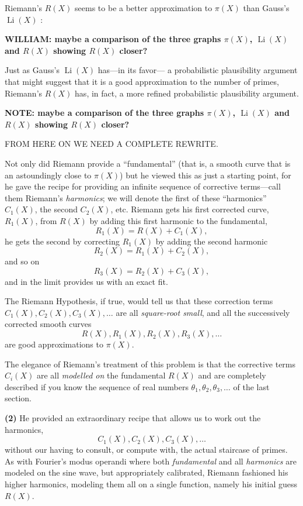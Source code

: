 \documentclass[11pt]{article}
\DeclareMathOperator{\Li}{Li}
\theoremstyle{plain}
\theoremstyle{definition}
\numberwithin{equation}{section}
\numberwithin{figure}{section}
\numberwithin{table}{section}
\begin{document}
{  Riemann's $R(X)$ seems to be a better approximation to $\pi(X)$ than Gauss's $\Li(X)$ :
  
   
\bigskip

{\bf WILLIAM: maybe a comparison of the three graphs $\pi(X)$, $\Li(X)$ and $R(X)$ showing $R(X)$ closer?}


   
\bigskip

Just as Gauss's $\Li(X)$ has---in its favor--- a probabilistic
plausibility argument that might suggest that it is a good
approximation to the number of primes, Riemann's $R(X)$ has, in fact,
a more refined probabilistic plausibility argument.


   
\bigskip

{\bf NOTE: maybe a comparison of the three graphs $\pi(X)$, $\Li(X)$ and $R(X)$ showing $R(X)$ closer?}


   
\bigskip
  
\centerline{FROM HERE ON WE NEED A COMPLETE REWRITE.}

\bigskip


Not only did Riemann provide a ``fundamental'' (that is, a smooth curve
that is an astoundingly close to $\pi(X)$) but he viewed this as just a
starting point, for he gave the recipe for providing an infinite
sequence of corrective terms---call them Riemann's {\em harmonics}; we
will denote the first of these ``harmonics'' $C_1(X)$, the second
$C_2(X)$, etc.  Riemann gets his first corrected curve, $R_1(X)$, from
$R(X)$ by adding this first harmonic to the fundamental, $$R_1(X) =
R(X) + C_1(X),$$ he gets the second by correcting $R_1(X)$ by adding
the second harmonic $$R_2(X) = R_1 (X) + C_2(X),$$ and so on $$R_3(X)
= R_2 (X) + C_3(X),$$ and in the limit provides us with an exact fit.

The Riemann Hypothesis, if true, would tell us that these correction
terms $C_1(X), C_2(X),C_3(X),\dots$ are all {\em square-root small},
and all the successively corrected smooth curves $$R(X), R_1(X),
R_2(X),R_3(X),\dots$$ are good approximations to $\pi(X)$.

\bigskip

The elegance of Riemann's treatment of this problem is that the
corrective terms $C_i(X)$ are all {\em modelled on} the fundamental
$R(X)$ and are completely described if you know the sequence of real
numbers $\theta_1, \theta_2, \theta_3,\dots$ of the last section.


{\bf (2) }He provided an extraordinary recipe that allows us to work
out the harmonics, $$C_1(X), C_2(X),C_3(X),\dots$$ without our having
to consult, or compute with, the actual staircase of primes. As with
Fourier's modus operandi where both {\em fundamental} and all {\em
  harmonics} are modeled on the sine wave, but appropriately
calibrated, Riemann fashioned his higher harmonics, modeling them all
on a single function, namely his initial guess $R(X)$.
 

}
\end{document}

